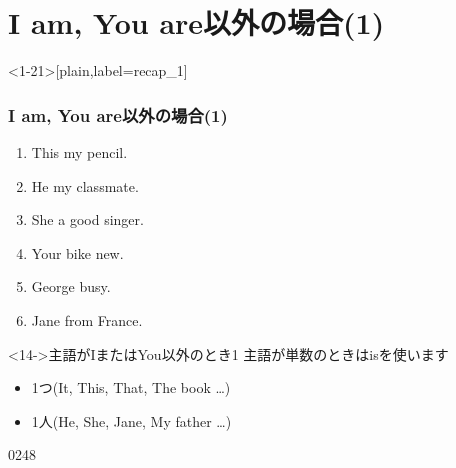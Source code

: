 \documentclass[aspectratio=169,xcolor={dvipsnames,table}]{beamer}
\begin{document}
\section{I am, You are以外の場合(1)}
\begin{frame}<1-21>[plain,label=recap_1]\frametitle{I am, You are以外の場合(1)}
  \begin{enumerate}
   \item<1-> This \textbf{\color{Maroon}{is}} my pencil. \hfill{}
   \item<1-> He \textbf{\color{Maroon}{is}} my classmate. \hfill{}
   \item<1-> She \textbf{\color{Maroon}{is}} a good singer. \hfill{}
   \item<1-> Your bike \textbf{\color{Maroon}{is}} new. \hfill{}
   \item<1-> George \textbf{\color{Maroon}{is}} busy. \hfill{}
   \item<1-> Jane \textbf{\color{Maroon}{is}} from France. \hfill{}
  \end{enumerate}

\bigskip

\begin{block}<14->{主語がIまたはYou以外のとき1}\small
主語が単数のときはisを使います
\begin{itemize}[square]
 \item 1つ(It, This, That, The book \ldots{})
 \item 1人(He, She, Jane, My father \ldots{})
\end{itemize}  
     \end{block}

\hfill{\tiny 0248}\,{\scriptsize {}}

\end{frame}
\end{document}

